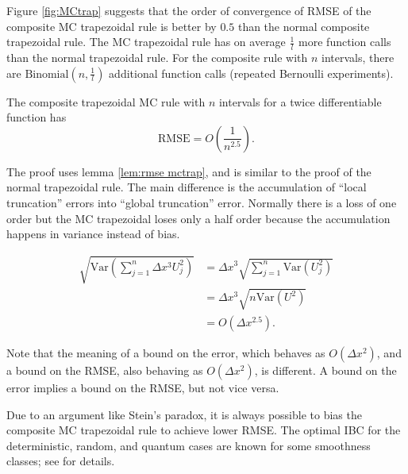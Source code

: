 \documentclass[a4paper,12pt]{article}
\begin{document}
Figure \ref{fig:MCtrap} suggests that the order of convergence of RMSE of the
composite MC trapezoidal rule is better by $0.5$ than the normal composite trapezoidal rule.
The MC trapezoidal rule has on average $\frac{1}{l}$ more function calls than
the normal trapezoidal rule. For the composite rule with $n$ intervals,
there are $\text{Binomial}(n,\frac{1}{l})$ additional function calls
(repeated Bernoulli experiments).\\

\begin{theorem} \label{thrm:order trap}
    The composite trapezoidal MC rule  with $n$ intervals
    for a twice differentiable function has
    \begin{equation}
        \text{RMSE} =O\left(\frac{1}{n^{2.5}} \right) .
    \end{equation}
\end{theorem}

The proof uses lemma \ref{lem:rmse mctrap},
and is similar to the proof of the normal
trapezoidal rule. The main difference is the
accumulation of \enquote{local truncation} errors into \enquote{global truncation} error.
Normally there is a loss of one order but the MC trapezoidal loses only a half order
because the accumulation happens in variance instead of bias.

\begin{align}
    \sqrt{\text{Var}\left(\sum_{j=1}^{n}  \Delta x^{3}U_{j}^{2}\right)}
     & = \Delta x^{3} \sqrt{ \sum_{j=1}^{n}\text{Var} (U_{j}^{2})} \\
     & = \Delta x^{3} \sqrt{ n \text{Var}(U^{2})}                  \\
     & = O( \Delta x^{2.5}).
\end{align}

Note that the meaning of a bound on the error, which behaves as $O(\Delta x^{2})$,
and a bound on the RMSE, also behaving as $O(\Delta x^{2})$, is different.
A bound on the error implies a bound on the RMSE, but not vice versa.

\begin{related}
    Due to an argument like Stein's paradox,
    it is always possible to bias the composite MC trapezoidal
    rule to achieve lower RMSE.
    The optimal IBC for the deterministic, random, and quantum cases are known
    for some smoothness classes; see \cite{heinrich_optimal_2001} for details.
\end{related}
\end{document}
